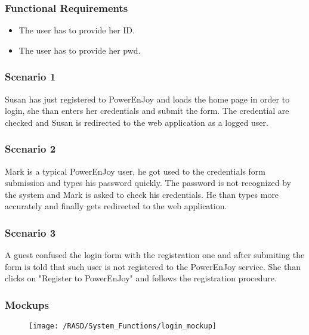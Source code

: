 \subsubsection{Functional Requirements}
\begin{itemize}
  \item The user has to provide her \gls{ID}.
  \item The user has to provide her \gls{pwd}.
\end{itemize}

\subsubsection{Scenario 1}
Susan has just registered to PowerEnJoy and loads the home page in order to login, she than enters her credentials and submit the form. The credential are checked and Susan is redirected to the web application as a logged user.

\subsubsection{Scenario 2}
Mark is a typical PowerEnJoy user, he got used to the credentials form submission and types his password quickly. The password is not recognized by the system and Mark is asked to check his credentials. He than types more accurately and finally gets redirected to the web application. %

\subsubsection{Scenario 3}
A guest confused the login form with the registration one and after submiting the form is told that such user is not registered to the PowerEnJoy service. She than clicks on "Register to PowerEnJoy" and follows the registration procedure.


\subsubsection{Mockups}
\begin{figure}[!ht]
  \centering
  \vspace{0.2cm}
  \texttt{[image: /RASD/System\_Functions/login\_mockup]}\\
  \vspace{0.4cm}
  \label{fig:login_mockup} 
\end{figure}


